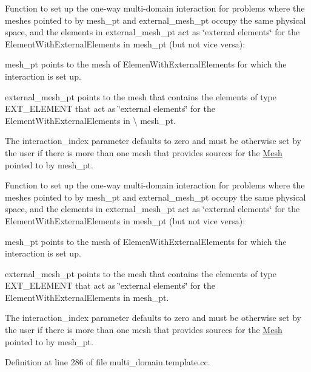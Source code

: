 Function to set up the one-\/way multi-\/domain interaction for problems where the meshes pointed to by {\ttfamily mesh\+\_\+pt} and {\ttfamily external\+\_\+mesh\+\_\+pt} occupy the same physical space, and the elements in {\ttfamily external\+\_\+mesh\+\_\+pt} act as \char`\"{}external elements\char`\"{} for the {\ttfamily Element\+With\+External\+Elements} in {\ttfamily mesh\+\_\+pt} (but not vice versa)\+: 


\begin{DoxyItemize}
\item {\ttfamily mesh\+\_\+pt} points to the mesh of Elemen\+With\+External\+Elements for which the interaction is set up.
\item {\ttfamily external\+\_\+mesh\+\_\+pt} points to the mesh that contains the elements of type E\+X\+T\+\_\+\+E\+L\+E\+M\+E\+NT that act as \char`\"{}external elements\char`\"{} for the {\ttfamily Element\+With\+External\+Elements} in \textbackslash{} mesh\+\_\+pt.
\item The interaction\+\_\+index parameter defaults to zero and must be otherwise set by the user if there is more than one mesh that provides sources for the \hyperlink{classoomph_1_1Mesh}{Mesh} pointed to by mesh\+\_\+pt.

Function to set up the one-\/way multi-\/domain interaction for problems where the meshes pointed to by {\ttfamily mesh\+\_\+pt} and {\ttfamily external\+\_\+mesh\+\_\+pt} occupy the same physical space, and the elements in {\ttfamily external\+\_\+mesh\+\_\+pt} act as \char`\"{}external elements\char`\"{} for the {\ttfamily Element\+With\+External\+Elements} in {\ttfamily mesh\+\_\+pt} (but not vice versa)\+:
\item {\ttfamily mesh\+\_\+pt} points to the mesh of Elemen\+With\+External\+Elements for which the interaction is set up.
\item {\ttfamily external\+\_\+mesh\+\_\+pt} points to the mesh that contains the elements of type E\+X\+T\+\_\+\+E\+L\+E\+M\+E\+NT that act as \char`\"{}external elements\char`\"{} for the {\ttfamily Element\+With\+External\+Elements} in {\ttfamily mesh\+\_\+pt}.
\item The interaction\+\_\+index parameter defaults to zero and must be otherwise set by the user if there is more than one mesh that provides sources for the \hyperlink{classoomph_1_1Mesh}{Mesh} pointed to by mesh\+\_\+pt. 
\end{DoxyItemize}

Definition at line 286 of file multi\+\_\+domain.\+template.\+cc.



